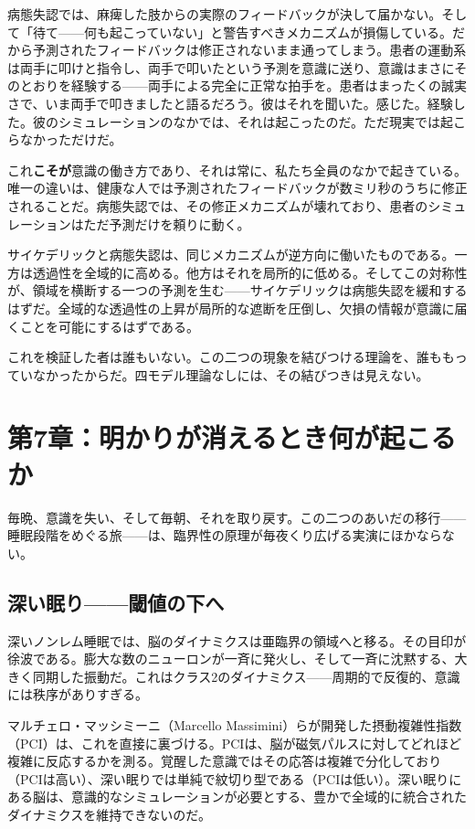 \documentclass[11pt, twoside, openright]{book}
\begin{document}
病態失認では、麻痺した肢からの実際のフィードバックが決して届かない。そして「待て------何も起こっていない」と警告すべきメカニズムが損傷している。だから予測されたフィードバックは修正されないまま通ってしまう。患者の運動系は両手に叩けと指令し、両手で叩いたという予測を意識に送り、意識はまさにそのとおりを経験する------両手による完全に正常な拍手を。患者はまったくの誠実さで、いま両手で叩きましたと語るだろう。彼はそれを聞いた。感じた。経験した。彼のシミュレーションのなかでは、それは起こったのだ。ただ現実では起こらなかっただけだ。

これ\textbf{こそが}意識の働き方であり、それは常に、私たち全員のなかで起きている。唯一の違いは、健康な人では予測されたフィードバックが数ミリ秒のうちに修正されることだ。病態失認では、その修正メカニズムが壊れており、患者のシミュレーションはただ予測だけを頼りに動く。

サイケデリックと病態失認は、同じメカニズムが逆方向に働いたものである。一方は透過性を全域的に高める。他方はそれを局所的に低める。そしてこの対称性が、領域を横断する一つの予測を生む------サイケデリックは病態失認を緩和するはずだ。全域的な透過性の上昇が局所的な遮断を圧倒し、欠損の情報が意識に届くことを可能にするはずである。

これを検証した者は誰もいない。この二つの現象を結びつける理論を、誰ももっていなかったからだ。四モデル理論なしには、その結びつきは見えない。


\chapter*{第7章：明かりが消えるとき何が起こるか}

毎晩、意識を失い、そして毎朝、それを取り戻す。この二つのあいだの移行------睡眠段階をめぐる旅------は、臨界性の原理が毎夜くり広げる実演にほかならない。

\section*{深い眠り------閾値の下へ}

深いノンレム睡眠では、脳のダイナミクスは亜臨界の領域へと移る。その目印が徐波である。膨大な数のニューロンが一斉に発火し、そして一斉に沈黙する、大きく同期した振動だ。これはクラス2のダイナミクス------周期的で反復的、意識には秩序がありすぎる。

マルチェロ・マッシミーニ（Marcello Massimini）らが開発した摂動複雑性指数（PCI）は、これを直接に裏づける。PCIは、脳が磁気パルスに対してどれほど複雑に反応するかを測る。覚醒した意識ではその応答は複雑で分化しており（PCIは高い）、深い眠りでは単純で紋切り型である（PCIは低い）。深い眠りにある脳は、意識的なシミュレーションが必要とする、豊かで全域的に統合されたダイナミクスを維持できないのだ。
\end{document}
